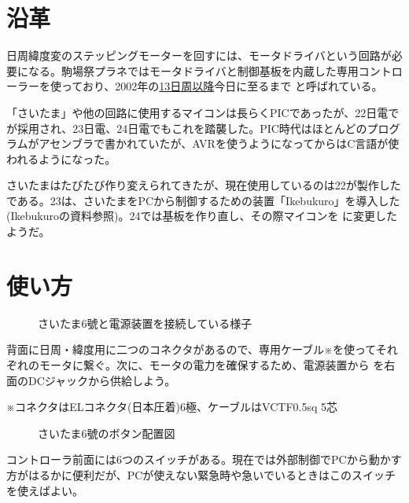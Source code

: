 \documentclass[letterpaper,10pt,dvipdfmx]{sphinxmanual}
\begin{document}
\section{沿革}
\label{\detokenize{nissyu-idohen/saitama:id3}}
日周緯度変のステッピングモーターを回すには、モータドライバという回路が必要になる。駒場祭プラネではモータドライバと制御基板を内蔵した専用コントローラーを使っており、2002年の\href{http://twitter.com/fujita\_d\_h/status/254087988882046976}{13日周以降}今日に至るまで
と呼ばれている。

「さいたま」や他の回路に使用するマイコンは長らくPICであったが、22日電で
が採用され、23日電、24日電でもこれを踏襲した。PIC時代はほとんどのプログラムがアセンブラで書かれていたが、AVRを使うようになってからはC言語が使われるようになった。

さいたまはたびたび作り変えられてきたが、現在使用しているのは22が製作した
である。23は、さいたまをPCから制御するための装置「Ikebukuro」を導入した(Ikebukuroの資料参照)。24では基板を作り直し、その際マイコンを
に変更したようだ。


\section{使い方}
\label{\detokenize{nissyu-idohen/saitama:id4}}\begin{figure}[htbp]
\centering
\capstart

\noindent{}
\caption{さいたま6號と電源装置を接続している様子}\label{\detokenize{nissyu-idohen/saitama:id9}}\end{figure}

背面に日周・緯度用に二つのコネクタがあるので、専用ケーブル※を使ってそれぞれのモータに繋ぐ。次に、モータの電力を確保するため、電源装置から
を右面のDCジャックから供給しよう。

※コネクタはELコネクタ(日本圧着)6極、ケーブルはVCTF0.5sq 5芯
\begin{figure}[htbp]
\centering
\capstart

\noindent{}
\caption{さいたま6號のボタン配置図}\label{\detokenize{nissyu-idohen/saitama:id10}}\end{figure}

コントローラ前面には6つのスイッチがある。現在では外部制御でPCから動かす方がはるかに便利だが、PCが使えない緊急時や急いでいるときはこのスイッチを使えばよい。
\end{document}
